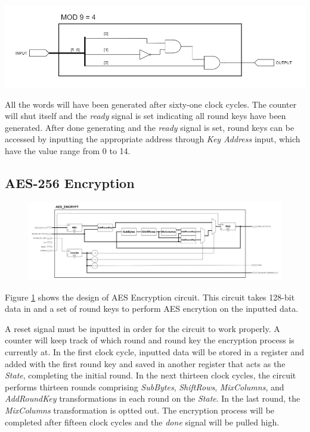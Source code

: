 \documentclass[a4paper, 10pt]{article}
\newenvironment{Figure}
    {\par\medskip\noindent\minipage{\linewidth}}
    {\endminipage\par\medskip}
\begin{document}
\begin{multicols}{2}
            \noindent
            \begin{Figure}
                \centering
                \includegraphics[width=\linewidth]{Mod9Eq4.png}
                \label{fig:mod9eq4}
            \end{Figure}

            All the words will have been generated after sixty-one clock cycles. The counter will shut itself and the \textit{ready} signal is set indicating all round keys have been generated. After done generating and the \textit{ready} signal is set, round keys can be accessed by inputting the appropriate address through \textit{Key Address} input, which have the value range from 0 to 14.
            
            \subsection{AES-256 Encryption}

	\noindent
            \begin{figure}[t]
                \centering
                \includegraphics[width=\linewidth]{AES_encrypt.png}
                \label{fig:AES_encrypt}
            \end{figure}

	Figure \ref{fig:AES_encrypt} shows the design of AES Encryption circuit. This circuit takes 128-bit data in and a set of round keys to perform AES encrytion on the inputted data.

	A reset signal must be inputted in order for the circuit to work properly. A counter will keep track of which round and round key the encryption process is currently at. In the first clock cycle, inputted data will be stored in a register and added with the first round key and saved in another register that acts as the \textit{State}, completing the initial round. In the next thirteen clock cycles, the circuit performs thirteen rounds comprising \textit{SubBytes}, \textit{ShiftRows}, \textit{MixColumns}, and \textit{AddRoundKey} transformations in each round on the \textit{State}. In the last round, the \textit{MixColumns} transformation is optted out. The encryption process will be completed after fifteen clock cycles and the \textit{done} signal will be pulled high.
	

\end{multicols}
\end{document}
